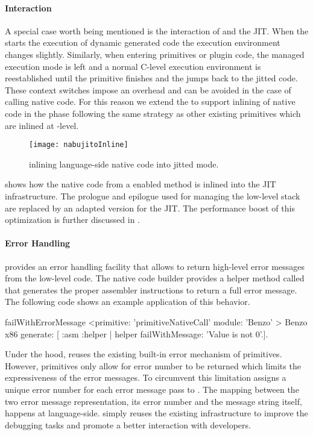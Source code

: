 \paragraph{\JIT Interaction}

A special case worth being mentioned is the interaction of \B and the JIT.
When the \PH \VM starts the execution of dynamic generated code the execution environment changes slightly.
Similarly, when entering primitives or plugin code, the managed execution mode is left and a normal C-level execution environment is reestablished until the primitive finishes and the \VM jumps back to the jitted code.
These context switches impose an overhead and can be avoided in the case of calling native code.
For this reason we extend the \VM to support inlining of native code in the \JIT phase following the same strategy as other existing primitives which are inlined at \JIT-level.
%
\begin{figure}[ht]
	\centering
	\texttt{[image: nabujitoInline]}
	\caption[\B \JIT Interaction]{\B inlining language-side native code into jitted mode.}
\end{figure}
%
 shows how the native code from a \B enabled method is inlined into the JIT infrastructure.
The \B prologue and epilogue used for managing the low-level stack are replaced by an adapted version for the JIT.
The performance boost of this optimization is further discussed in .


\paragraph{Error Handling}

\B provides an error handling facility that allows to return high-level error messages from the low-level code.
The native code builder provides a helper method called  that generates the proper assembler instructions to return a full error message. The following code shows an example application of this behavior.
%
\begin{stcode}[emph={asm}]{5}
failWithErrorMessage
	<primitive: 'primitiveNativeCall' 
	 module: 'Benzo' >
	 Benzo x86 generate: [ :asm :helper |
		helper failWithMessage: 'Value is not 0'.].
\end{stcode}
%
Under the hood, \B reuses the existing built-in error mechanism of \PH primitives.
However, primitives only allow for error number to be returned which limits the expressiveness of the error messages.
To circumvent this limitation \B assigns a unique error number for each error message pass to .
The mapping between the two error message representation, its error number and the message string itself, happens at language-side.
\B simply reuses the existing infrastructure to improve the debugging tasks and promote a better interaction with developers.

